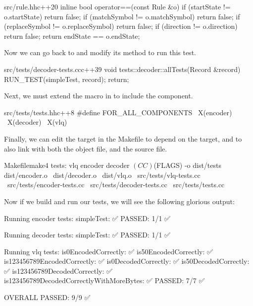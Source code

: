 \begin{file}{src/rule.hh}{c++}{20}
    inline bool operator==(const Rule &o)
    {
        if (startState != o.startState)
            return false;
        if (matchSymbol != o.matchSymbol)
            return false;
        if (replaceSymbol != o.replaceSymbol)
            return false;
        if (direction != o.direction)
            return false;
        return endState == o.endState;
    }
\end{file}

Now we can go back to  and modify its  method to run this test.

\begin{file}{src/tests/decoder-tests.cc}{c++}{39}
void tests::decoder::allTests(Record &record)
{
    RUN_TEST(simpleTest, record);
    return;
}
\end{file}

Next, we must extend the  macro in  to include the  component.

\begin{file}{src/tests/tests.hh}{c++}{8}
#define FOR_ALL_COMPONENTS \
    X(encoder)             \
    X(decoder)             \
    X(vlq)
\end{file}

Finally, we can edit the  target in the Makefile to depend on the  target, and to also link with both the  object file, and the  source file.

\begin{file}{Makefile}{make}{4}
tests: vlq encoder decoder
	$(CC) $(FLAGS) -o dist/tests dist/encoder.o \
	                             dist/decoder.o \
	                             dist/vlq.o \
	                             src/tests/vlq-tests.cc \
	                             src/tests/encoder-tests.cc \
	                             src/tests/decoder-tests.cc \
	                             src/tests/tests.cc
\end{file}

Now if we build and run our tests, we will see the following glorious output:

\begin{stdout}
Running encoder tests:
  simpleTest: ✅
PASSED: 1/1 ✅

Running decoder tests:
  simpleTest: ✅
PASSED: 1/1 ✅

Running vlq tests:
  is0EncodedCorrectly: ✅
  is50EncodedCorrectly: ✅
  is123456789EncodedCorrectly: ✅
  is0DecodedCorrectly: ✅
  is50DecodedCorrectly: ✅
  is123456789DecodedCorrectly: ✅
  is123456789DecodedCorrectlyWithMoreBytes: ✅
PASSED: 7/7 ✅

OVERALL PASSED: 9/9 ✅
\end{stdout}

